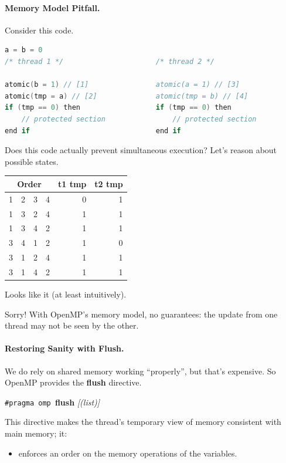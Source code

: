 \documentclass[a4paper]{report}
\begin{document}
\paragraph{Memory Model Pitfall.} Consider this code.

  \begin{lstlisting}[language=C]
                    a = b = 0
/* thread 1 */                      /* thread 2 */

atomic(b = 1) // [1]                atomic(a = 1) // [3]
atomic(tmp = a) // [2]              atomic(tmp = b) // [4]
if (tmp == 0) then                  if (tmp == 0) then
    // protected section                // protected section
end if                              end if
  \end{lstlisting}

Does this code actually prevent simultaneous execution?
Let's reason about possible states.

  \begin{center}
  \begin{tabular}{r r r r | r r}
    \multicolumn{4}{c|}{Order} & t1 tmp & t2 tmp\\
    \hline
    1 & 2 & 3 & 4 & 0 & 1\\
    1 & 3 & 2 & 4 & 1 & 1\\
    1 & 3 & 4 & 2 & 1 & 1\\
    3 & 4 & 1 & 2 & 1 & 0\\
    3 & 1 & 2 & 4 & 1 & 1\\
    3 & 1 & 4 & 2 & 1 & 1\\
  \end{tabular}
  \end{center}

Looks like it (at least intuitively).

Sorry! With OpenMP's memory model, no guarantees:
the update from one thread may not be seen by the other.

\paragraph{Restoring Sanity with Flush.} We do rely on 
shared memory working ``properly'', but that's expensive.
So OpenMP provides the {\bf flush} directive.

  \begin{center}
    {\tt \#pragma omp }{\bf flush} {\it[(list)]}
  \end{center}

This directive makes the thread's temporary view of memory consistent with main
      memory; it:
\begin{itemize}
    \item enforces an order on the memory operations of the variables.
\end{itemize}
\end{document}

